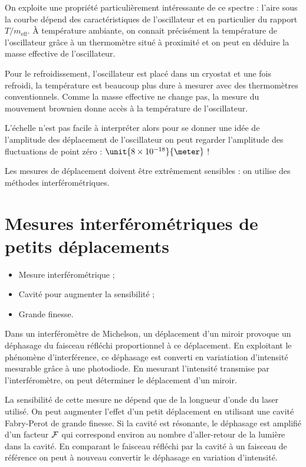 \documentclass[12pt,a4paper]{article}
\newenvironment{transition}
{%
	\addcontentsline{ldf}{figure}{0}%
	\begin{transition2_env}}
	{\end{transition2_env}}
\newenvironment{slide}
	{%
		\addcontentsline{ldf}{figure}{0}%
		\begin{slide_env}}
		{\end{slide_env}
	}
\begin{document}
On exploite une propriété particulièrement intéressante de ce spectre : l'aire sous la courbe dépend des caractéristiques de l'oscillateur et en particulier du rapport $T/m_\mathrm{eff}$.
À température ambiante, on connait précisément la température de l'oscillateur grâce à un thermomètre situé à proximité et on peut en déduire la masse effective de l'oscillateur.

Pour le refroidissement, l'oscillateur est placé dans un cryostat et une fois refroidi, la température est beaucoup plus dure à mesurer avec des thermomètres conventionnels.
Comme la masse effective ne change pas, la mesure du mouvement brownien donne accès à la température de l'oscillateur.

L'échelle n'est pas facile à interpréter alors pour se donner une idée de l'amplitude des déplacement de l'oscillateur on peut regarder l'amplitude des fluctuations de point zéro : $\unit{8\times10^{-18}}{\meter}$ !

\begin{transition}
Les mesures de déplacement doivent être extrêmement sensibles : on utilise des méthodes interférométriques.
\end{transition}

\section{Mesures interférométriques de petits déplacements}

\begin{slide}
\begin{itemize}
\item Mesure interférométrique ;
\item Cavité pour augmenter la sensibilité ;
\item Grande finesse.
\end{itemize}
\end{slide}

Dans un interféromètre de Michelson, un déplacement d'un miroir provoque un déphasage du faisceau réfléchi proportionnel à ce déplacement.
En exploitant le phénomène d'interférence, ce déphasage est converti en variatiation d'intensité mesurable grâce à une photodiode.
En mesurant l'intensité transmise par l'interféromètre, on peut déterminer le déplacement d'un miroir.

La sensibilité de cette mesure ne dépend que de la longueur d'onde du laser utilisé.
On peut augmenter l'effet d'un petit déplacement en utilisant une cavité Fabry-Perot de grande finesse.
Si la cavité est résonante, le déphasage est amplifié d'un facteur $\cal{F}$ qui correspond environ au nombre d'aller-retour de la lumière dans la cavité.
En comparant le faisceau réfléchi par la cavité à un faisceau de référence on peut à nouveau convertir le déphasage en variation d'intensité.
\end{document}
